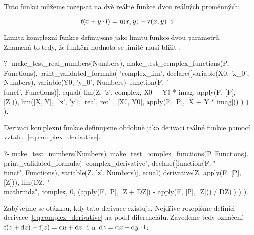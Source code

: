 Tuto funkci můžeme rozepsat na dvě reálné funkce dvou reálných proměnných:

\begin{equation}
\mathrm{f}(x + y \cdot \mathrm{i}) = \mathrm{u}(x, y) + \mathrm{v}(x, y) \cdot \mathrm{i}
\end{equation}

Limitu komplexní funkce definujeme jako limitu funkce dvou parametrů. Znamená to tedy, že funkční hodnota se limitě musí blížit .

\begin{prolog}
?-	make_test_real_numbers(Numbers),
	make_test_complex_functions(P, Functions),
	print_validated_formula(
		'complex_lim',
		declare([variable(X0, 'x_0', Numbers), variable(Y0, 'y_0', Numbers), function(F, '\\func{f}', Functions)],
			equal(
				lim(Z, 'z', complex, X0 + Y0 * imag, apply(F, [P], [Z])),
				lim([X, Y], ['x', 'y'], [real, real], [X0, Y0], apply(F, [P], [X + Y * imag]))
			)
		)
	).
\end{prolog}

Derivaci komplexní funkce definujeme obdobně jako derivaci reálné funkce pomocí vztahu~\eqref{eq:complex_derivative}.

\begin{prolog}
?-	make_test_numbers(Numbers),
	make_test_complex_functions(P, Functions),
	print_validated_formula(
		"complex_derivative",
		declare([function(F, "\\func{f}", Functions), variable(Z, 'z', Numbers)],
			equal(
				derivative(Z, apply(F, [P], [Z])),
				lim(DZ, "\\mathrm{d}z", complex, 0, (apply(F, [P], [Z + DZ]) - apply(F, [P], [Z])) / DZ)
			)
		)
	).
\end{prolog}

Zabývejme se otázkou, kdy tato derivace existuje. Nejdříve rozepišme definici derivace~\eqref{eq:complex_derivative} na podíl diferenciálů. Zavedeme tedy označení \(\mathrm{f}(z + \mathrm{d}z) - \mathrm{f}(z) = \mathrm{d}u + \mathrm{d}v \cdot \mathrm{i}\) a~\(\mathrm{d}z = \mathrm{d}x + \mathrm{d}y \cdot \mathrm{i}\):

